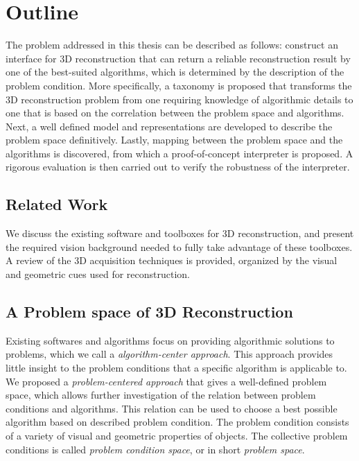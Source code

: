 \section{Outline}
The problem addressed in this thesis can be described as follows: construct an interface for 3D reconstruction that can return a reliable reconstruction result by one of the best-suited algorithms, which is determined by the description of the problem condition. More specifically, a taxonomy is proposed that transforms the 3D reconstruction problem from one requiring knowledge of algorithmic details to one that is based on the correlation between the problem space and algorithms. Next, a well defined model and representations are developed to describe the problem space definitively. Lastly, mapping between the problem space and the algorithms is discovered, from which a proof-of-concept interpreter is proposed. A rigorous evaluation is then carried out to verify the robustness of the interpreter. 

\subsection{Related Work}
We discuss the existing software and toolboxes for 3D reconstruction, and present the required vision background needed to fully take advantage of these toolboxes. A review of the 3D acquisition techniques is provided, organized by the visual and geometric cues used for reconstruction.

\subsection{A Problem space of 3D Reconstruction}
Existing softwares and algorithms focus on providing algorithmic solutions to problems, which we call a \textit{algorithm-center approach}. This approach provides little insight to the problem conditions that a specific algorithm is applicable to. We proposed a \textit{problem-centered approach} that gives a well-defined problem space, which allows further investigation of the relation between problem conditions and algorithms. This relation can be used to choose a best possible algorithm based on described problem condition. The problem condition consists of a variety of visual and geometric properties of objects. The collective problem conditions is called \textit{problem condition space}, or in short \textit{problem space}.

